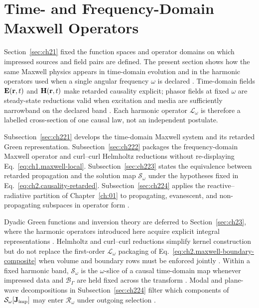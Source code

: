 \section{Time- and Frequency-Domain Maxwell Operators}
\label{sec:ch22}

Section~\ref{sec:ch21} fixed the function spaces and operator domains on which impressed sources and field pairs are defined. The present section shows how the same Maxwell physics appears in time-domain evolution and in the harmonic operators used when a single angular frequency $\omega$ is declared \cite{stratton1941}. Time-domain fields $\mathbf{E}(\mathbf{r},t)$ and $\mathbf{H}(\mathbf{r},t)$ make retarded causality explicit; phasor fields at fixed $\omega$ are steady-state reductions valid when excitation and media are sufficiently narrowband on the declared band \cite{harrington2001}. Each harmonic operator $\mathcal{L}_\omega$ is therefore a labelled cross-section of one causal law, not an independent postulate.

Subsection~\ref{sec:ch221} develops the time-domain Maxwell system and its retarded Green representation. Subsection~\ref{sec:ch222} packages the frequency-domain Maxwell operator and curl--curl Helmholtz reductions without re-displaying Eq.~\eqref{eq:ch1.maxwell-local}. Subsection~\ref{sec:ch223} states the equivalence between retarded propagation and the solution map $\mathcal{S}_\omega$ under the hypotheses fixed in Eq.~\eqref{eq:ch2.causality-retarded}. Subsection~\ref{sec:ch224} applies the reactive--radiative partition of Chapter~\ref{ch:01} to propagating, evanescent, and non-propagating subspaces in operator form \cite{stratton1941}.

Dyadic Green functions and inversion theory are deferred to Section~\ref{sec:ch23}, where the harmonic operators introduced here acquire explicit integral representations \cite{stratton1941}. Helmholtz and curl--curl reductions simplify kernel construction but do not replace the first-order $\mathcal{L}_\omega$ packaging of Eq.~\eqref{eq:ch2.maxwell-boundary-composite} when volume and boundary rows must be enforced jointly \cite{harrington2001}. Within a fixed harmonic band, $\mathcal{S}_\omega$ is the $\omega$-slice of a causal time-domain map whenever impressed data and $\mathcal{B}_\Gamma$ are held fixed across the transform \cite{stratton1941}. Modal and plane-wave decompositions in Subsection~\ref{sec:ch224} filter which components of $\mathcal{S}_\omega[\mathbf{J}_{\mathrm{imp}}]$ may enter $\mathcal{R}_\omega$ under outgoing selection \cite{harrington2001}.